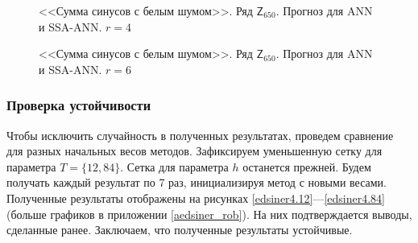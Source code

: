 \documentclass[specialist,
               substylefile = spbu.rtx,
               subf,href,colorlinks=true, 12p]{disser}
\newcommand{\multiref}[2]{\ref{#1}---\ref{#2}}
\begin{document}
\begin{figure}[H]
	\captionsetup{justification=centering}
	\caption{<<Сумма синусов с белым шумом>>. Ряд $\mathsf{Z}_{650}$. Прогноз для ANN и SSA-ANN. $r = 4$}
	\label{edsinr_r4_res_ann}
\end{figure}

\begin{figure}[H]
	\captionsetup{justification=centering}
	\caption{<<Сумма синусов с белым шумом>>. Ряд $\mathsf{Z}_{650}$. Прогноз для ANN и SSA-ANN. $r = 6$}
	\label{edsinr_r6_res_ann}
\end{figure}

\subsubsection{Проверка устойчивости}
\label{edsiner_rob}

Чтобы исключить случайность в полученных результатах, проведем сравнение для разных начальных весов методов. Зафиксируем уменьшенную сетку для параметра $T = \{12, 84\}$. Сетка для параметра $h$ останется прежней. Будем получать каждый результат по 7 раз, инициализируя метод с новыми весами. Полученные результаты отображены на рисунках \multiref{edsiner4.12}{edsiner4.84} (больше графиков в приложении \ref{aedsiner_rob}). На них подтверждается выводы, сделанные ранее. Заключаем, что полученные результаты устойчивые.
\end{document}
